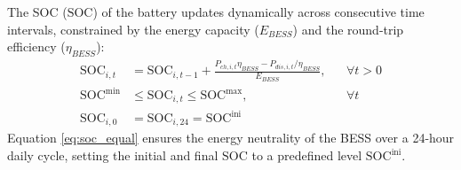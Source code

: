 The SOC ($\text{SOC}$) of the battery updates dynamically across consecutive time intervals, constrained by the energy capacity ($E_{BESS}$) and the round-trip efficiency ($\eta_{BESS}$):
\begin{subequations}
\begin{align}
    \text{SOC}_{i,t} &= \text{SOC}_{i,t-1} + \frac{P_{ch,i,t}\eta_{BESS} - P_{dis,i,t}/\eta_{BESS}}{E_{BESS}}, && \forall t > 0 \label{eq:soc_update} \\
    \text{SOC}^{\min} &\le \text{SOC}_{i,t} \le \text{SOC}^{\max}, && \forall t \label{eq:soc_limit} \\
    \text{SOC}_{i,0} &= \text{SOC}_{i,24} = \text{SOC}^{\text{ini}} && \label{eq:soc_equal}
\end{align}
\end{subequations}
Equation \eqref{eq:soc_equal} ensures the energy neutrality of the BESS over a 24-hour daily cycle, setting the initial and final $\text{SOC}$ to a predefined level $\text{SOC}^{\text{ini}}$.

